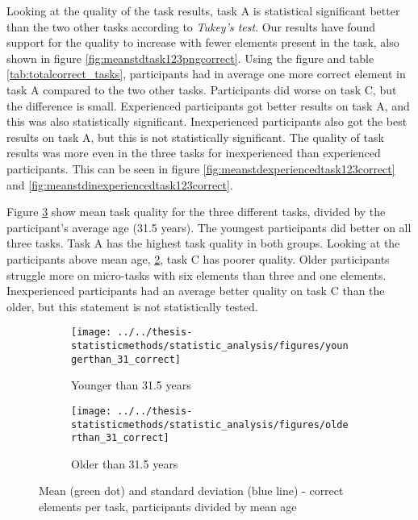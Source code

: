 Looking at the quality of the task results, task A is statistical significant better than the two other tasks according to \textit{Tukey's test}. Our results have found support for the quality to increase with fewer elements present in the task, also shown in figure \ref{fig:meanstdtask123pngcorrect}. Using the figure and table \ref{tab:totalcorrect_tasks}, participants had in average one more correct element in task A compared to the two other tasks. Participants did worse on task C, but the difference is small. Experienced participants got better results on task A, and this was also statistically significant. Inexperienced participants also got the best results on task A, but this is not statistically significant. The quality of task results was more even in the three tasks for inexperienced than experienced participants. This can be seen in figure \ref{fig:meanstdexperiencedtask123correct} and \ref{fig:meanstdinexperiencedtask123correct}. 

Figure \ref{fig:splittedbymeanage} show mean task quality for the three different tasks, divided by the participant's average age (31.5 years). The youngest participants did better on all three tasks. Task A has the highest task quality in both groups. Looking at the participants above mean age, \ref{fig:olderthan31correct}, task C has poorer quality. Older participants struggle more on micro-tasks with six elements than three and one elements. Inexperienced participants had an average better quality on task C than the older, but this statement is not statistically tested. 

\begin{figure}[H]
	\centering
	\begin{subfigure}[b]{0.4\textwidth}
		\centering
		\texttt{[image: ../../thesis-statisticmethods/statistic\_analysis/figures/youngerthan\_31\_correct]}
		\caption{Younger than 31.5 years}
		\label{fig:youngerthan31correct}
	\end{subfigure}
	\begin{subfigure}[b]{0.4\textwidth}
		\centering
		\texttt{[image: ../../thesis-statisticmethods/statistic\_analysis/figures/olderthan\_31\_correct]}
		\caption{Older than 31.5 years}
		\label{fig:olderthan31correct}
	\end{subfigure}
	\caption{Mean (green dot) and standard deviation (blue line) - correct elements per task, participants divided by mean age}
	\label{fig:splittedbymeanage}
\end{figure}

